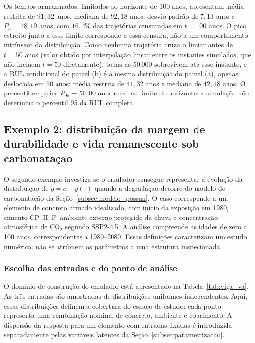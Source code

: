 Os tempos armazenados, limitados ao horizonte de 100 anos, apresentam média restrita de $91{,}32$ anos, mediana de $92{,}18$ anos, desvio padrão de $7{,}13$ anos e $P_5=78{,}19$ anos, com $16{,}4\%$ das trajetórias censuradas em $t=100$ anos. O pico estreito junto a esse limite corresponde a essa censura, não a um comportamento intrínseco da distribuição. Como nenhuma trajetória cruza o limiar antes de $t=50$ anos (valor obtido por interpolação linear entre os instantes simulados, que não incluem $t=50$ diretamente), todas as $50.000$ sobrevivem até esse instante, e a RUL condicional do painel (b) é a mesma distribuição do painel (a), apenas deslocada em $50$ anos: média restrita de $41{,}32$ anos e mediana de $42{,}18$ anos. O percentil empírico $P_{95}=50{,}00$ anos recai no limite do horizonte: a simulação não determina o percentil 95 da RUL completa.

\subsection{Exemplo 2: distribuição da margem de durabilidade e vida remanescente sob carbonatação}
\label{subsec:exemplo2}

O segundo exemplo investiga se o emulador consegue representar a evolução da distribuição de $g=c-y(t)$ quando a degradação decorre do modelo de carbonatação da Seção~\ref{subsec:modelo_possan}. O caso corresponde a um elemento de concreto armado idealizado, com início da exposição em 1980, cimento CP~II~F, ambiente externo protegido da chuva e concentração atmosférica de CO$_2$ segundo SSP2-4.5. A análise compreende as idades de zero a 100 anos, correspondentes a 1980--2080. Essas definições caracterizam um estudo numérico; não se atribuem os parâmetros a uma estrutura inspecionada.

\subsubsection{Escolha das entradas e do ponto de análise}

O domínio de construção do emulador está apresentado na Tabela~\ref{tab:viga_va}. As três entradas são amostradas de distribuições uniformes independentes. Aqui, essas distribuições definem a cobertura do espaço de estudo: cada ponto representa uma combinação nominal de concreto, ambiente e cobrimento. A dispersão da resposta para um elemento com entradas fixadas é introduzida separadamente pelas variáveis latentes da Seção~\ref{subsec:parametrizacao}.


